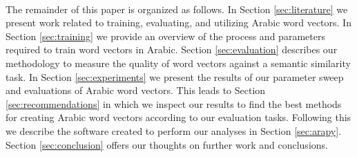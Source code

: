 \\
The remainder of this paper is organized as follows. In Section \ref{sec:literature} we present work related to training, evaluating, and utilizing Arabic word vectors. In Section \ref{sec:training} we provide an overview of the process and parameters required to train word vectors in Arabic. Section \ref{sec:evaluation} describes our methodology to measure the quality of word vectors against a semantic similarity task. In Section \ref{sec:experiments} we present the results of our parameter sweep and evaluations of Arabic word vectors. This leads to Section \ref{sec:recommendations} in which we inspect our results to find the best methods for creating Arabic word vectors according to our evaluation tasks. Following this we describe the software created to perform our analyses in Section \ref{sec:arapy}. Section \ref{sec:conclusion} offers our thoughts on further work and conclusions.
